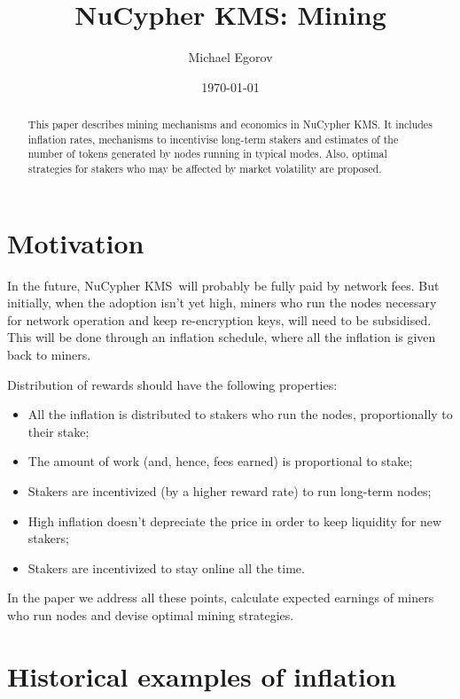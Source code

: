 \documentclass[longbibliography,nofootinbib,twocolumn]{revtex4-1}
\newcommand{\kms}{NuCypher KMS}
\begin{document}
\title{\kms: Mining}

\author{Michael Egorov}

\begin{abstract}
    This paper describes mining mechanisms and economics in \kms.
    It includes inflation rates, mechanisms to incentivise long-term stakers
    and estimates of the number of tokens generated by nodes running in typical modes.
    Also, optimal strategies for stakers who may be affected by market volatility are proposed.
\end{abstract}

\date{\today}
\maketitle

\section{Motivation}

In the future, \kms~will probably be fully paid by network fees.
But initially, when the adoption isn't yet high, miners who run the nodes necessary for network operation and keep re-encryption keys,
will need to be subsidised.
This will be done through an inflation schedule, where all the inflation is given back to miners.

Distribution of rewards should have the following properties:
\begin{itemize}
    \item All the inflation is distributed to stakers who run the nodes, proportionally to their stake;
    \item The amount of work (and, hence, fees earned) is proportional to stake;
    \item Stakers are incentivized (by a higher reward rate) to run long-term nodes;
    \item High inflation doesn't depreciate the price in order to keep liquidity for new stakers;
    \item Stakers are incentivized to stay online all the time.
\end{itemize}

In the paper we address all these points, calculate expected earnings of miners who run nodes and devise optimal mining strategies.

\section{Historical examples of inflation}
\end{document}

